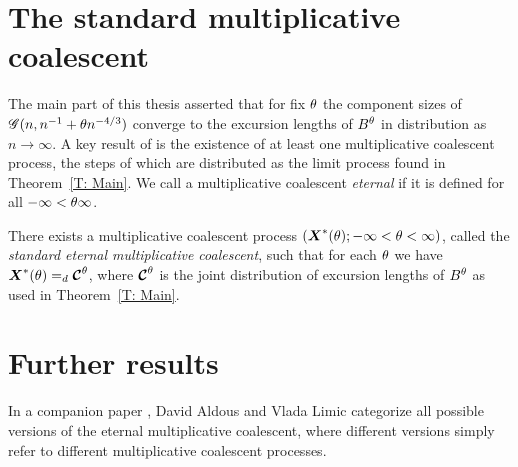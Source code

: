 \section{The standard multiplicative coalescent}

The main part of this thesis asserted that for fix $\theta$ the component sizes of $\mathscr{G}(n, n^{-1} + \theta n^{-4/3})$ converge to the excursion lengths of $B^{\theta}$
in distribution as $n \rightarrow \infty$.
A key result of \cite{Aldous.1997} is the existence of at least one multiplicative coalescent process, 
the steps of which are distributed as the limit process found in Theorem~\ref{T: Main}.
We call a multiplicative coalescent \emph{eternal} if it is defined for all $-\infty < \theta \infty$.

\begin{theorem}
	There exists a multiplicative coalescent process
	$ (\boldsymbol{X}^*(\theta); -\infty < \theta < \infty) $,
	called the \emph{standard eternal multiplicative coalescent},
	such that for each $\theta$ we have $\boldsymbol{X}^*(\theta) =_d \boldsymbol{\mathcal{C}}^{\theta}$,
	where $\boldsymbol{\mathcal{C}}^{\theta}$ is the joint distribution of excursion lengths of $B^{\theta}$ as used in Theorem~\ref{T: Main}.
\end{theorem}


\section{Further results}

In a companion paper \cite{Aldous.1998}, 
David Aldous and Vlada Limic categorize all possible versions of the eternal multiplicative coalescent,
where different versions simply refer to different multiplicative coalescent processes.





